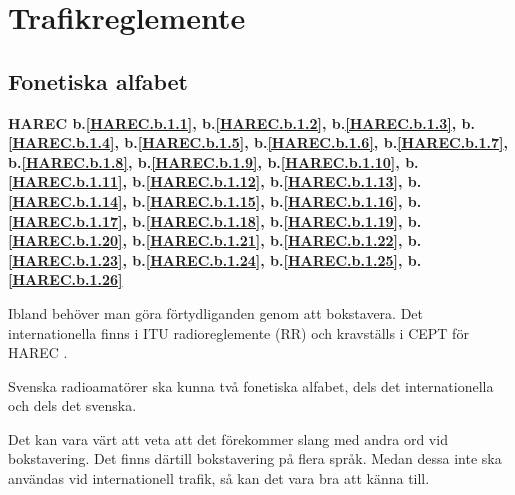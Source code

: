 \chapter{Trafikreglemente}

\section{Fonetiska alfabet}
\textbf{
HAREC b.\ref{HAREC.b.1.1}\label{myHAREC.b.1.1},
 b.\ref{HAREC.b.1.2}\label{myHAREC.b.1.2},
 b.\ref{HAREC.b.1.3}\label{myHAREC.b.1.3},
 b.\ref{HAREC.b.1.4}\label{myHAREC.b.1.4},
 b.\ref{HAREC.b.1.5}\label{myHAREC.b.1.5},
 b.\ref{HAREC.b.1.6}\label{myHAREC.b.1.6},
 b.\ref{HAREC.b.1.7}\label{myHAREC.b.1.7},
 b.\ref{HAREC.b.1.8}\label{myHAREC.b.1.8},
 b.\ref{HAREC.b.1.9}\label{myHAREC.b.1.9},
 b.\ref{HAREC.b.1.10}\label{myHAREC.b.1.10},
 b.\ref{HAREC.b.1.11}\label{myHAREC.b.1.11},
 b.\ref{HAREC.b.1.12}\label{myHAREC.b.1.12},
 b.\ref{HAREC.b.1.13}\label{myHAREC.b.1.13},
 b.\ref{HAREC.b.1.14}\label{myHAREC.b.1.14},
 b.\ref{HAREC.b.1.15}\label{myHAREC.b.1.15},
 b.\ref{HAREC.b.1.16}\label{myHAREC.b.1.16},
 b.\ref{HAREC.b.1.17}\label{myHAREC.b.1.17},
 b.\ref{HAREC.b.1.18}\label{myHAREC.b.1.18},
 b.\ref{HAREC.b.1.19}\label{myHAREC.b.1.19},
 b.\ref{HAREC.b.1.20}\label{myHAREC.b.1.20},
 b.\ref{HAREC.b.1.21}\label{myHAREC.b.1.21},
 b.\ref{HAREC.b.1.22}\label{myHAREC.b.1.22},
 b.\ref{HAREC.b.1.23}\label{myHAREC.b.1.23},
 b.\ref{HAREC.b.1.24}\label{myHAREC.b.1.24},
 b.\ref{HAREC.b.1.25}\label{myHAREC.b.1.25},
 b.\ref{HAREC.b.1.26}\label{myHAREC.b.1.26}
}

Ibland behöver man göra förtydliganden genom att bokstavera.
Det internationella finns i ITU radioreglemente (RR) \cite[Appendix 14]{ITU-RR}
och kravställs i CEPT för HAREC \cite[Annex 6]{TR6102}.

Svenska radioamatörer ska kunna två fonetiska alfabet, dels det
internationella och dels det svenska.

Det kan vara värt att veta att det förekommer slang med andra ord vid
bokstavering.
Det finns därtill bokstavering på flera språk.
Medan dessa inte ska användas vid internationell trafik, så kan det vara bra
att känna till.

